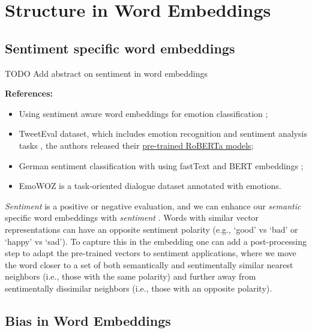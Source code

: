 \documentclass[11pt, a4paper]{amsart}
\begin{document}
\section{Structure in Word Embeddings}

\subsection{Sentiment specific word embeddings}

TODO Add abstract on sentiment in word embeddings

\noindent \textbf{References:}
\begin{itemize}
	\item Using sentiment aware word embeddings for emotion classification \cite{sentiment-aware-word-embedding-emotion-2019};
	\item TweetEval dataset, which includes emotion recognition and sentiment analysis tasks \cite{barbieri-etal-2020-tweeteval}, the authors released their \href{https://huggingface.co/cardiffnlp/twitter-roberta-base-sentiment}{pre-trained RoBERTa models};
	\item German sentiment classification with using fastText and BERT embeddings \cite{guhr-etal-2020-training};
	\item EmoWOZ \cite{DBLP:journals/corr/abs-2109-04919} is a task-oriented dialogue dataset annotated with emotions.
\end{itemize}

{
	\color{blue}
	
	\emph{Sentiment} is a positive or negative evaluation, and we can enhance our \emph{semantic} specific word embeddings with \emph{sentiment} \cite{yu-etal-2017-refining}.
	Words with similar vector representations can have an opposite sentiment polarity (e.g., `good' vs `bad' or `happy' vs `sad').
	To capture this in the embedding one can add a post-processing step to adapt the pre-trained vectors to sentiment applications,
	where we move the word closer to a set of both semantically and sentimentally similar nearest neighbors (i.e., those with the same polarity) and further away from sentimentally dissimilar neighbors (i.e., those with an opposite polarity).
} %



\subsection{Bias in Word Embeddings}
\end{document}
